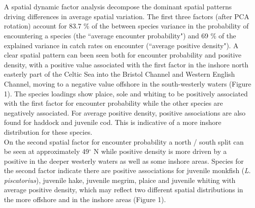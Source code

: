 \documentclass[fleqn,10pt]{wlscirep}
\begin{document}
\begin{linenumbers}
\subsection*{ 
		\\} 
A spatial dynamic factor analysis 
decompose the dominant spatial patterns driving differences
in average spatial variation.  The first three factors (after PCA rotation)
account for 83.7 \% of the between species variance in the probability of
encountering a species (the ``average encounter probability") and 69 \% of the
explained variance in catch rates on encounter (``average positive density"). A
clear spatial pattern can been seen both for  encounter
probability and  positive density, with a positive
 value associated with the first factor in the
inshore north easterly part of the Celtic Sea into the Bristol Channel and
Western English Channel, moving to a negative  value
offshore in the south-westerly waters (Figure 1).  The species loadings
 show plaice, sole and whiting to be positively
associated with the first factor for  encounter
probability while the other species are negatively associated. For average
positive density, positive associations are also found for haddock and juvenile
cod. This is indicative of a more inshore distribution for these species.\\ 

On the second spatial factor for  encounter probability a
north / south split can be seen at approximately 49$^{\circ}$ N while positive
density is more driven by a positive  in
the deeper westerly waters as well as some inshore areas. Species
 for the second factor indicate there are
positive associations for juvenile monkfish (\emph{L.  piscatorius}), juvenile
hake, juvenile megrim, plaice and juvenile whiting with average positive
density, which may reflect two different spatial distributions in the more
offshore and in the inshore areas (Figure 1).\\


\end{linenumbers}
\end{document}
